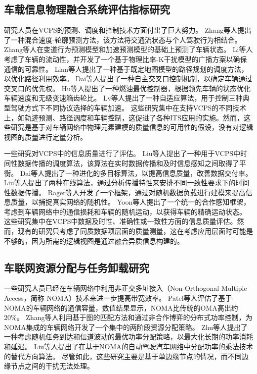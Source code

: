 \subsection{车载信息物理融合系统评估指标研究}

研究人员在VCPS的预测、调度和控制技术方面付出了巨大努力。
Zhang等人\cite{zhang2019a}提出了一种混合速度-轮廓预测方法，该方法将交通流状态与个人驾驶行为相结合。
Zhang等人\cite{zhang2020data}在变道行为预测模型和加速预测模型的基础上预测了车辆状态。
Li等人\cite{li2020cyber}考虑了车辆的流动性，并开发了一个基于物理比率-K干扰模型的广播方案以确保通信的可靠性。
Lian等人\cite{lian2021cyber}提出了一种基于既定地图模型的路径规划的调度方法，以优化路径利用效率。
Dai等人\cite{dai2016a}提出了一种自主交叉口控制机制，以确定车辆通过交叉口的优先权。
Hu等人\cite{hu2017cyber}提出了一种燃油最优控制器，根据领先车辆的状态优化车辆速度和无级变速箱齿轮比。
Lv等人\cite{lv2018driving}提出了一种自适应算法，用于控制三种典型驾驶方式下不同协议选择的车辆加速。
这些研究集中在支持VCPS的不同技术上，如轨迹预测、路径调度和车辆控制，这促进了各种ITS应用的实施。然而，这些研究是基于对车辆网络中物理元素建模的质量信息的可用性的假设，没有对逻辑视图的质量进行定量分析。

一些研究对VCPS中的信息质量进行了评估。
Liu等人\cite{liu2014temporal}提出了一种用于VCPS中时间性数据传播的调度算法，该算法在实时数据传播和及时信息感知之间取得了平衡。
Dai等人\cite{dai2019temporal}提出了一种进化的多目标算法，以提高信息质量，改善数据交付率。
Liu等人\cite{liu2014scheduling}提出了两种在线算法，通过分析传播特性来安排不同一致性要求下的时间性数据传播。
Rager等人\cite{rager2017scalability}开发了一个框架，通过对随机数据负载进行建模来提高信息质量，以捕捉真实网络的随机性。
Yoon等人\cite{yoon2021performance}提出了一个统一的合作感知框架，考虑到车辆网络中的通信损耗和车辆的随机运动，以获得车辆的精确运动状态。
这些研究集中在VCPS中数据及时性、准确性或一致性方面的信息质量评估。然而，现有的研究只考虑了同质数据项层面的质量测量，这在考虑应用层面时可能是不够的，因为所需的逻辑视图是通过融合异质信息构建的。

\subsection{车联网资源分配与任务卸载研究}

一些研究人员已经在车辆网络中利用非正交多址接入（Non-Orthogonal Multiple Access，简称 NOMA）技术来进一步提高带宽效率。
Patel等人\cite{patel2021performance}评估了基于NOMA的车辆网络的通信容量，数值结果显示，NOMA比传统的OMA高出约20\%。
Zhang等人\cite{zhang2021centralized}利用基于图的匹配方法和通过非合作博弈的分布式功率控制，为NOMA集成的车辆网络开发了一个集中的两阶段资源分配策略。
Zhu等人\cite{zhu2021decentralized}提出了一种考虑随机任务到达和信道波动的最优功率分配策略，以最大化长期的功率消耗和延迟。
Liu等人\cite{liu2019energy}提出了在基于NOMA的自动驾驶汽车网络中分配功率的乘法技术的替代方向算法。
尽管如此，这些研究主要是基于单边缘节点的情况，而不同边缘节点之间的干扰无法处理。

